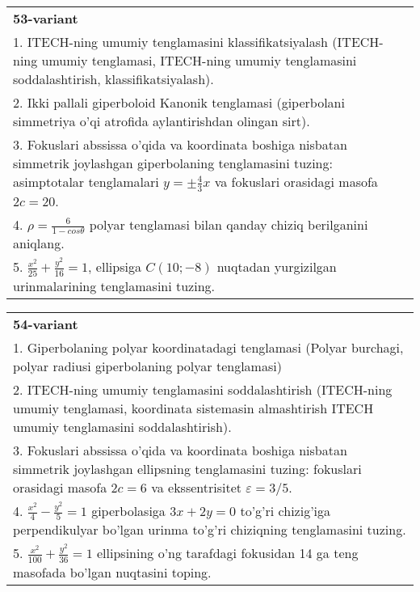 \documentclass{article}
\begin{document}
\begin{tabular}{m{17cm}}
\textbf{53-variant}\\
1. ITECH-ning umumiy tenglamasini klassifikatsiyalash (ITECH-ning umumiy tenglamasi, ITECH-ning umumiy tenglamasini soddalashtirish, klassifikatsiyalash).\\

2. Ikki pallali giperboloid Kanonik tenglamasi (giperbolani simmetriya o'qi atrofida aylantirishdan olingan sirt).\\

3. Fokuslari abssissa o'qida va koordinata boshiga nisbatan simmetrik joylashgan giperbolaning tenglamasini tuzing: asimptotalar tenglamalari $y=\pm \frac{4}{3}x$ va fokuslari orasidagi masofa $2c=20$.\\

4. $\rho = \frac{6}{1 - cos\theta}$ polyar tenglamasi bilan qanday chiziq berilganini aniqlang.  \\

5. $\frac{x^{2}}{25} + \frac{y^{2}}{16} = 1$, ellipsiga $C(10; - 8)$ nuqtadan yurgizilgan urinmalarining tenglamasini tuzing.  
\end{tabular}
\vspace{1cm}


\begin{tabular}{m{17cm}}
\textbf{54-variant}\\
1. Giperbolaning polyar koordinatadagi tenglamasi (Polyar burchagi, polyar radiusi giperbolaning polyar tenglamasi)\\

2. ITECH-ning umumiy tenglamasini soddalashtirish (ITECH-ning umumiy tenglamasi, koordinata sistemasin almashtirish ITECH umumiy tenglamasini soddalashtirish).\\

3. Fokuslari abssissa o'qida va koordinata boshiga nisbatan simmetrik joylashgan ellipsning tenglamasini tuzing: fokuslari orasidagi masofa $2c=6$ va ekssentrisitet $\varepsilon=3/5$.\\

4. $\frac{x^{2}}{4} - \frac{y^{2}}{5} = 1$ giperbolasiga $3x + 2y = 0$ to'g'ri chizig'iga perpendikulyar bo'lgan urinma to'g'ri chiziqning tenglamasini tuzing.\\

5. $\frac{x^{2}}{100} + \frac{y^{2}}{36} = 1$ ellipsining o'ng tarafdagi fokusidan 14 ga teng masofada bo'lgan nuqtasini toping.  
\end{tabular}
\vspace{1cm}
\end{document}
